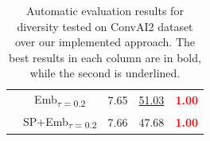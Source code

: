 \documentclass[letterpaper]{article} %
\begin{document}
\begin{table}[h]
\begin{tabular}{|c|c|c|c|c|}
\multirow{3}{*}{} &Emb\textsubscript{$\tau=0.2$}   &7.65	&\underline{51.03}	&\textbf{\textcolor{red}{1.00}}\\
\cline{2-5}

\multirow{3}{*}{} &SP+Emb\textsubscript{$\tau=0.2$} 	&7.66	&47.68  &\textbf{\textcolor{red}{1.00}}\\
\hline
\end{tabular}
\caption{Automatic evaluation results for diversity tested on ConvAI2 dataset over our implemented approach. The best results in each column are in bold, while the second is underlined.}
\label{table:text-diversity}
\end{table}

\end{document}
